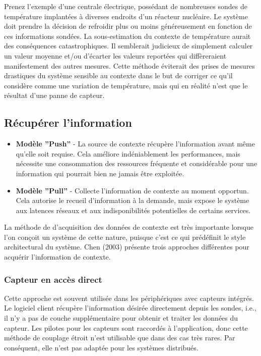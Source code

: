 Prenez l'exemple d'une centrale électrique, possédant de nombreuses sondes de
température implantées à diverses endroits d'un réacteur nucléaire. Le système
doit prendre la décision de refroidir plus ou moins généreusement en fonction
de ces informations sondées. La sous-estimation du contexte de température
aurait des conséquences catastrophiques. Il semblerait judicieux de simplement
calculer un valeur moyenne et/ou d'écarter les valeurs reportées qui
diffèreraient manifestement des autres mesures. Cette méthode éviterait
des prises de mesures drastiques du système sensible au contexte dans le but de
corriger ce qu'il considère comme une variation de température, mais qui en
réalité n'est que le résultat d'une panne de capteur.

\subsection{Récupérer l'information}

\begin{itemize}
  \item \textbf{Modèle ''Push''} - 
	  La source de contexte récupère l'information avant même qu'elle soit
	  requise. Cela améliore indéniablement les performances, mais nécessite
	  une consommation des ressources fréquente et considérable pour une
	  information qui pourrait bien ne jamais être exploitée.
  \item \textbf{Modèle ''Pull''} - 
	  Collecte l'information de contexte au moment opportun.  Cela autorise
	  le recueil d'information à la demande, mais expose le système aux
	  latences réseaux et aux indisponibilités potentielles de certains
	  services.
\end{itemize}

La méthode de d'acquisition des données de contexte est très importante lorsque
l'on conçoit un système de cette nature, puisque c'est ce qui prédéfinit le style
architectural du système. Chen (2003) \cite{chen_intelligent_2003} présente
trois approches différentes pour acquérir l'information de contexte.

\subsubsection{Capteur en accès direct}

Cette approche est souvent utilisée dans les périphériques avec capteurs
intégrés. Le logiciel client récupère l'information désirée directement depuis
les sondes, i.e., il n'y a pas de couche supplémentaire pour obtenir et traiter
les données du capteur. Les pilotes pour les capteurs sont raccordés à
l'application, donc cette méthode de couplage étroit n'est utilisable que dans
des cas très rares. Par conséquent, elle n'est pas adaptée pour les systèmes
distribués.


